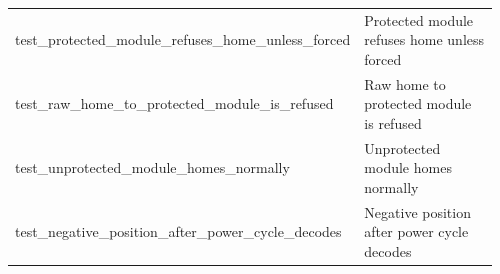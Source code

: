 \begin{longtable}{@{}>{\ttfamily\scriptsize\raggedright\arraybackslash}p{0.40\linewidth} >{\footnotesize\raggedright\arraybackslash}p{0.555\linewidth}@{}}
test\_\allowbreak{}protected\_\allowbreak{}module\_\allowbreak{}refuses\_\allowbreak{}home\_\allowbreak{}unless\_\allowbreak{}forced & Protected module refuses home unless forced \\
test\_\allowbreak{}raw\_\allowbreak{}home\_\allowbreak{}to\_\allowbreak{}protected\_\allowbreak{}module\_\allowbreak{}is\_\allowbreak{}refused & Raw home to protected module is refused \\
test\_\allowbreak{}unprotected\_\allowbreak{}module\_\allowbreak{}homes\_\allowbreak{}normally & Unprotected module homes normally \\
test\_\allowbreak{}negative\_\allowbreak{}position\_\allowbreak{}after\_\allowbreak{}power\_\allowbreak{}cycle\_\allowbreak{}decodes & Negative position after power cycle decodes \\
\end{longtable}
